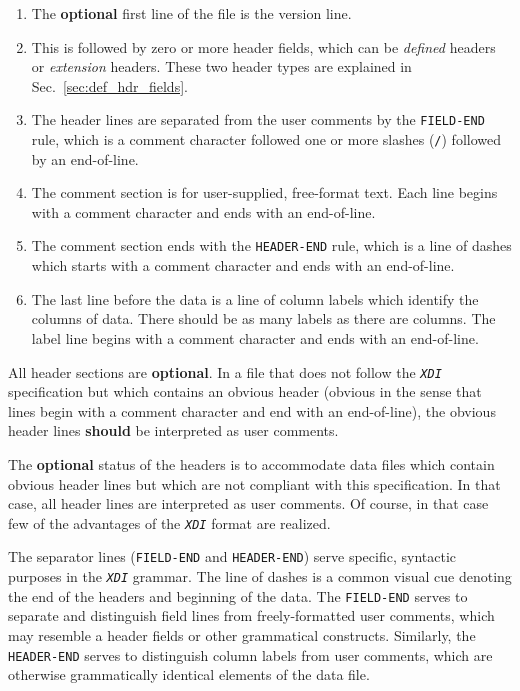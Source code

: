\documentclass{article}
\newcommand{\sltt}[1]{\texttt{\textsl{#1}}}
\newcommand{\xdi}{\sltt{XDI}}
\begin{document}
\begin{enumerate}
\item The \textbf{optional} first line of the file is the version
  line.
\item This is followed by zero or more header fields, which can be
  \textit{defined} headers or \textit{extension} headers.  These two
  header types are explained in Sec.~\ref{sec:def_hdr_fields}.
\item The header lines are separated from the user comments by the
  \texttt{FIELD-END} rule, which is a comment character followed one
  or more slashes (\texttt{/}) followed by an end-of-line.
\item The comment section is for user-supplied, free-format text.
  Each line begins with a comment character and ends with an
  end-of-line.
\item The comment section ends with the \texttt{HEADER-END} rule,
  which is a line of dashes which starts with a comment character and
  ends with an end-of-line.
\item The last line before the data is a line of column labels which
  identify the columns of data.  There should be as many labels as
  there are columns.  The label line begins with a comment character
  and ends with an end-of-line.
\end{enumerate}

All header sections are \textbf{optional}.  In a file that does not
follow the {\xdi} specification but which contains an obvious header
(obvious in the sense that lines begin with a comment character and
end with an end-of-line), the obvious header lines \textbf{should} be
interpreted as user comments.

The \textbf{optional} status of the headers is to accommodate data
files which contain obvious header lines but which are not compliant
with this specification.  In that case, all header lines are
interpreted as user comments.  Of course, in that case few of the
advantages of the {\xdi} format are realized.

The separator lines (\texttt{FIELD-END} and \texttt{HEADER-END}) serve
specific, syntactic purposes in the {\xdi} grammar.  The line of
dashes is a common visual cue denoting the end of the headers and
beginning of the data.  The \texttt{FIELD-END} serves to separate and
distinguish field lines from freely-formatted user comments, which may
resemble a header fields or other grammatical constructs.  Similarly,
the \texttt{HEADER-END} serves to distinguish column labels from user
comments, which are otherwise grammatically identical elements of the
data file.
\end{document}
